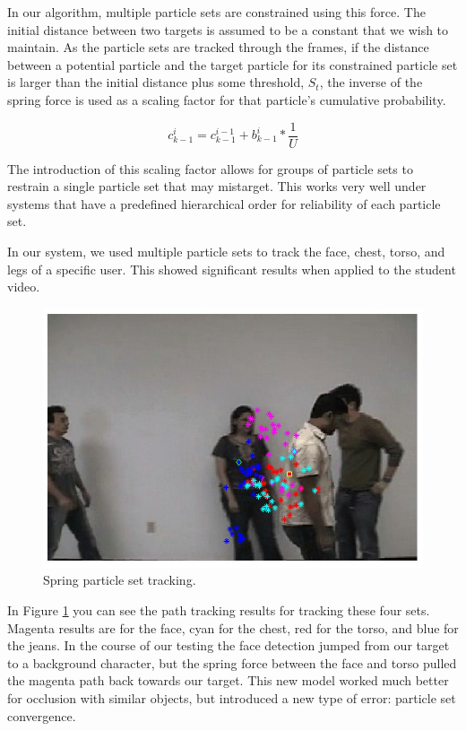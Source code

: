 \documentclass[11pt]{article}
\begin{document}
In our algorithm, multiple particle sets are constrained using this force.  The initial distance between two targets is assumed to be a constant that we wish to maintain.  As the particle sets are tracked through the frames, if the distance between a potential particle and the target particle for its constrained particle set is larger than the initial distance plus some threshold, $S_t$, the inverse of the spring force is used as a scaling factor for that particle's cumulative probability.

\begin{equation}
 c^i_{k-1} = c^{i-1}_{k-1} + b^i_{k-1} * \frac{1}{U} 
\label{eq:bprob}
\end{equation}  

The introduction of this scaling factor allows for groups of particle sets to restrain a single particle set that may mistarget.  This works very well under systems that have a predefined hierarchical order for reliability of each particle set.  

In our system, we used multiple particle sets to track the face, chest, torso, and legs of a specific user.  This showed significant results when applied to the student video.  
 
\begin{figure}[H]
\centering
\includegraphics[scale=0.3]{img/SpringResults.jpg}
\caption{Spring particle set tracking.}
\label{fig:SpringTracking}
\end{figure}

In Figure \ref{fig:SpringTracking} you can see the path tracking results for tracking these four sets.  Magenta results are for the face, cyan for the chest, red for the torso, and blue for the jeans.  In the course of our testing the face detection jumped from our target to a background character, but the spring force between the face and torso pulled the magenta path back towards our target.  This new model worked much better for occlusion with similar objects, but introduced a new type of error: particle set convergence.  
\end{document}
